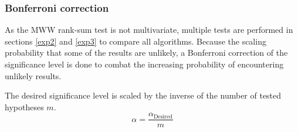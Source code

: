 \subsubsection{Bonferroni correction}
As the MWW rank-sum test is not multivariate, multiple tests are performed in sections \ref{exp2} and \ref{exp3} to compare all algorithms. Because the scaling probability that some of the results are unlikely, a Bonferroni correction of the significance level is done to combat the increasing probability of encountering unlikely results. 

The desired significance level is scaled by the inverse of the number of tested hypotheses \(m\). 
\begin{equation*}
    \alpha=\frac{\alpha_{\text{Desired}}}{m}
\end{equation*}
